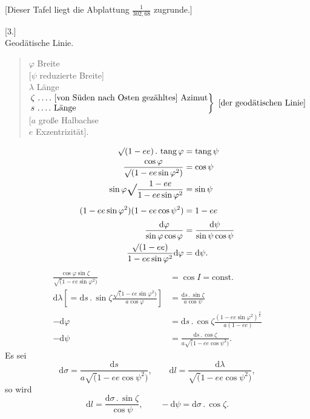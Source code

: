 \begin{center}
[Dieser Tafel liegt die Abplattung \(\frac1{302{,}68}\) zugrunde.]
\end{center}

\par\clearpage
\noindent{}\makebox[12mm][r]{}\par\medskip

\begin{center}
[3.]\\[.5ex]
Geodätische Linie.
\end{center}
\begin{quote}
\noindent \(\varphi\)  Breite\\
{[}\(\psi\)  reduzierte Breite]\\
\(\lambda\)  Länge\\
\(\left.
\begin{array}{@{}l@{}}
\zeta\ \text{\ixpoints{4} [von Süden nach Osten gezähltes] Azimut}\\
s\ \text{\ixpoints{4} Länge}
\end{array}
\right\}\ \text{[der geodätischen Linie]}\)\\
{[}\(a\)  große Halbachse\\
\(e\)  Exzentrizität].
\end{quote}
\[
\begin{aligned}
\surd(1-ee)\,.\,\operatorname{tang}\varphi&=\operatorname{tang}\psi\\
\frac{\cos\varphi}{\surd(1-ee\sin\varphi^2)}&=\cos\psi\\
\sin\varphi\ixrad\frac{1-ee}{1-ee\sin\varphi^2}&=\sin\psi\\
(1-ee\sin\varphi^2)(1-ee\cos\psi^2)&=1-ee\\
\frac{\mathrm d\varphi}{\sin\varphi\cos\varphi}
&=\frac{\mathrm d\psi}{\sin\psi\cos\psi}\\
\frac{\surd(1-ee)}{1-ee\sin\varphi^2}\mathrm d\varphi&=\mathrm d\psi.
\end{aligned}
\]
\noindent [Es ist]
\[
\begin{aligned}
\frac{\cos\varphi\sin\zeta}{\surd(1-ee\sin\varphi^2)}&=\cos I=\text{const.}\\
\mathrm d\lambda
\left[=\mathrm ds\,.\,\sin\zeta\frac{\surd(1-ee\sin\varphi^2)}{a\cos\varphi}\right]
&=\frac{\mathrm ds\,.\,\sin\zeta}{a\cos\psi}\\
-\mathrm d\varphi
&=\mathrm ds\,.\,\cos\zeta\frac{(1-ee\sin\varphi^2)^{\frac32}}{a(1-ee)}\\
-\mathrm d\psi&=\frac{\mathrm ds\,.\,\cos\zeta}{a\surd(1-ee\cos\psi^2)}.
\end{aligned}
\]
Es sei
\[
\mathrm d\sigma=\frac{\mathrm ds}{a\surd(1-ee\cos\psi^2)},\qquad
\mathrm dl=\frac{\mathrm d\lambda}{\surd(1-ee\cos\psi^2)},
\]
\noindent so wird
\[
\mathrm dl=\frac{\mathrm d\sigma\,.\,\sin\zeta}{\cos\psi},\qquad
-\mathrm d\psi=\mathrm d\sigma\,.\,\cos\zeta.
\]
\noindent [Da]
\noindent [so ist]
\par

